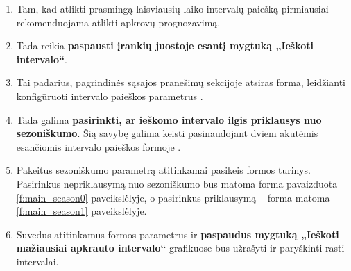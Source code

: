 \begin{enumerate}
  \item Tam, kad atlikti prasmingą laisviausių laiko intervalų
    paiešką pirmiausiai rekomenduojama atlikti apkrovų prognozavimą.
  \item Tada reikia \textbf{paspausti įrankių juostoje 
    esantį mygtuką „Ieškoti intervalo“}.
  \item Tai padarius, pagrindinės sąsajos pranešimų sekcijoje
    atsiras forma, leidžianti konfigūruoti intervalo paieškos
    parametrus .
  \item Tada galima \textbf{pasirinkti, ar ieškomo intervalo ilgis
    priklausys nuo sezoniškumo}. Šią savybę galima keisti
    pasinaudojant dviem akutėmis esančiomis intervalo paieškos
    formoje .
  \item Pakeitus sezoniškumo parametrą atitinkamai pasikeis formos
    turinys. Pasirinkus nepriklausymą nuo sezoniškumo bus matoma forma
    pavaizduota \ref{f:main_season0} paveikslėlyje, o pasirinkus 
    priklausymą – forma matoma \ref{f:main_season1} paveikslėlyje.
  \item Suvedus atitinkamus formos parametrus ir \textbf{paspaudus
    mygtuką „Ieškoti mažiausiai apkrauto intervalo“} grafikuose bus
    užrašyti ir paryškinti rasti intervalai.
\end{enumerate}
